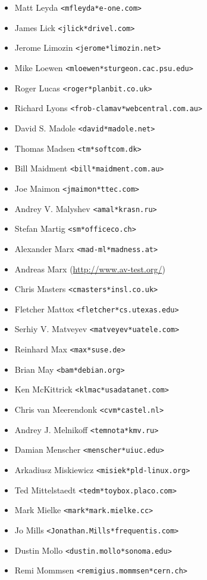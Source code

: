 \documentclass[a4paper,titlepage,12pt]{article}
\newcommand{\email}[1]{\texttt{#1}}
\begin{document}
\begin{itemize}
	\item Matt Leyda \email{<mfleyda*e-one.com>}
	\item James Lick \email{<jlick*drivel.com>}
	\item Jerome Limozin \email{<jerome*limozin.net>}
	\item Mike Loewen \email{<mloewen*sturgeon.cac.psu.edu>}
	\item Roger Lucas \email{<roger*planbit.co.uk>}
	\item Richard Lyons \email{<frob-clamav*webcentral.com.au>}
	\item David S. Madole \email{<david*madole.net>}
	\item Thomas Madsen \email{<tm*softcom.dk>}
	\item Bill Maidment \email{<bill*maidment.com.au>}
	\item Joe Maimon \email{<jmaimon*ttec.com>}
	\item Andrey V. Malyshev \email{<amal*krasn.ru>}
	\item Stefan Martig \email{<sm*officeco.ch>}
	\item Alexander Marx \email{<mad-ml*madness.at>}
	\item Andreas Marx (\url{http://www.av-test.org/})
	\item Chris Masters \email{<cmasters*insl.co.uk>}
	\item Fletcher Mattox \email{<fletcher*cs.utexas.edu>}
	\item Serhiy V. Matveyev \email{<matveyev*uatele.com>}
	\item Reinhard Max \email{<max*suse.de>}
	\item Brian May \email{<bam*debian.org>}
	\item Ken McKittrick \email{<klmac*usadatanet.com>}
	\item Chris van Meerendonk \email{<cvm*castel.nl>}
	\item Andrey J. Melnikoff \email{<temnota*kmv.ru>}
	\item Damian Menscher \email{<menscher*uiuc.edu>}
	\item Arkadiusz Miskiewicz \email{<misiek*pld-linux.org>}
	\item Ted Mittelstaedt \email{<tedm*toybox.placo.com>}
	\item Mark Mielke \email{<mark*mark.mielke.cc>}
	\item Jo Mills \email{<Jonathan.Mills*frequentis.com>}
	\item Dustin Mollo \email{<dustin.mollo*sonoma.edu>}
	\item Remi Mommsen \email{<remigius.mommsen*cern.ch>}

\end{itemize}
\end{document}
